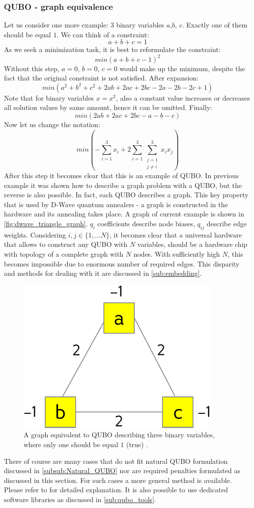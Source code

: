 \subsubsection{QUBO - graph equivalence}
\label{subsub:graph_equivalence}
Let us consider one more example: 3 binary variables $a$,$b$, $c$. Exactly one of them should be equal $1$. We can think of a constraint:
\[a+b+c=1\]
As we seek a minimization task, it is best to reformulate the constraint:
\[min(a+b+c-1)^2\]
Without this step, $a=0$, $b=0$, $c=0$ would make up the minimum, despite the fact that the original constraint is not satisfied. After expansion:
\[min(a^2+b^2+c^2+2ab+2ac+2bc-2a-2b-2c+1)\]
Note that for binary variables $x=x^2$, also a constant value increases or decreases all solution values by same amount, hence it can be omitted. Finally:
\[min(2ab+2ac+2bc-a-b-c)\]
Now let us change the notation:
\[min(-\sum_{i=1}^3x_i + 2\sum_{i=1}^3\sum_{\substack{j=1 \\ j\neq i}}^3 x_i x_j)\]
After this step it becomes clear that this is an example of QUBO. In previous example it was shown how to describe a graph problem with a QUBO, but the reverse is also possible. In fact, each QUBO describes a graph. This key property that is used by D-Wave quantum annealers - a graph is constructed in the hardware and its annealing takes place. A graph of current example is shown in \autoref{fig:dwave_triangle_graph}. $q_i$ coefficients describe node biases, $q_{ij}$ describe edge weights. Considering $i, j \in \{1,\ldots N\}$, it becomes clear that a universal hardware that allows to construct any QUBO with $N$ variables, should be a hardware chip with topology of a complete graph with $N$ nodes. With sufficiently high $N$, this becomes impossible due to enormous number of required edges. This disparity and methods for dealing with it are discussed in \autoref{sub:embedding}.

\begin{figure}
	\centering
	\includegraphics[width=0.4\columnwidth]{graphics/dwave_triangle_graph.png}
	\caption{A graph equivalent to QUBO describing three binary variables, where only one should be equal $1$ (true) \cite{d-wave_inc_d-wave_2022}.}
    \label{fig:dwave_triangle_graph}
\end{figure}

There of course are many cases that do not fit natural QUBO formulation discussed in \autoref{subsub:Natural_QUBO} nor are required penalties formulated as discussed in this section. For such cases a more general method is available. Please refer to \cite{glover_quantum_2019} for detailed explanation. It is also possible to use dedicated software libraries as discussed in \autoref{sub:qubo_tools}.